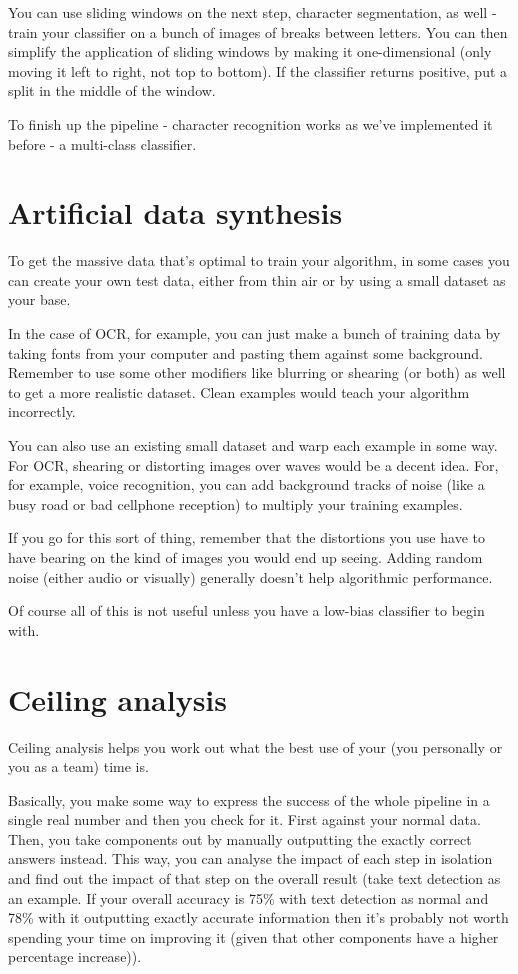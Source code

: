 You can use sliding windows on the next step, character segmentation, as well - train your classifier on a bunch of images of breaks between letters. You can then simplify the application of sliding windows by making it one-dimensional (only moving it left to right, not top to bottom). If the classifier returns positive, put a split in the middle of the window.

To finish up the pipeline - character recognition works as we've implemented it before - a multi-class classifier.

\section{Artificial data synthesis}

To get the massive data that's optimal to train your algorithm, in some cases you can create your own test data, either from thin air or by using a small dataset as your base.

In the case of OCR, for example, you can just make a bunch of training data by taking fonts from your computer and pasting them against some background. Remember to use some other modifiers like blurring or shearing (or both) as well to get a more realistic dataset. Clean examples would teach your algorithm incorrectly.

You can also use an existing small dataset and warp each example in some way. For OCR, shearing or distorting images over waves would be a decent idea. For, for example, voice recognition, you can add background tracks of noise (like a busy road or bad cellphone reception) to multiply your training examples.

If you go for this sort of thing, remember that the distortions you use have to have bearing on the kind of images you would end up seeing. Adding random noise (either audio or visually) generally doesn't help algorithmic performance.

Of course all of this is not useful unless you have a low-bias classifier to begin with.

\section{Ceiling analysis}

Ceiling analysis helps you work out what the best use of your (you personally or you as a team) time is.

Basically, you make some way to express the success of the whole pipeline in a single real number and then you check for it. First against your normal data. Then, you take components out by manually outputting the exactly correct answers instead. This way, you can analyse the impact of each step in isolation and find out the impact of that step on the overall result (take text detection as an example. If your overall accuracy is 75\% with text detection as normal and 78\% with it outputting exactly accurate information then it's probably not worth spending your time on improving it (given that other components have a higher percentage increase)).



